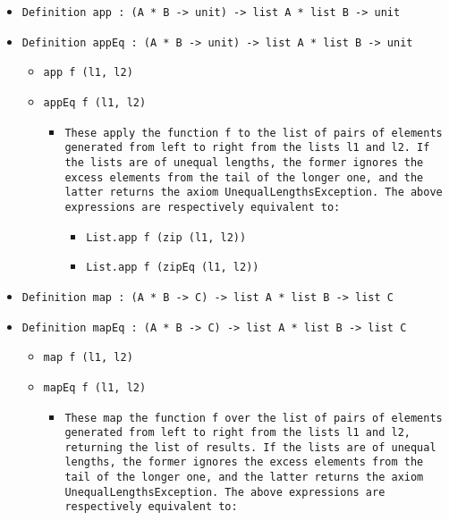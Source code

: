 \documentclass[11pt]{report}
\begin{document}
\begin{itemize}
\begin{itemize}
\end{itemize}

\item  \texttt{Definition app : (A * B -> unit) -> list A * list B -> unit}

\item  \texttt{Definition appEq : (A * B -> unit) -> list A * list B -> unit}

\begin{itemize} 
\item \texttt{app f (l1, l2)} 
\item \texttt{appEq f (l1, l2)} 

\begin{itemize}

\item \begin{flushleft} \texttt{These apply the function f to the list of pairs of elements generated from left to right from the lists l1 and l2. If the lists are of unequal lengths, the former ignores the excess elements from the tail of the longer one, and the latter returns the axiom UnequalLengthsException. The above expressions are respectively equivalent to:} \end{flushleft}

\begin{itemize}
\item  \texttt{List.app f (zip (l1, l2))}
\item  \texttt{List.app f (zipEq (l1, l2))}
\end{itemize}

\end{itemize}
\end{itemize}

\item \texttt{Definition map : (A * B -> C) -> list A * list B -> list C}

\item  \texttt{Definition mapEq : (A * B -> C) -> list A * list B -> list C}

\begin{itemize}
\item \texttt{map f (l1, l2)} 
\item \texttt{mapEq f (l1, l2)} 

\begin{itemize}
\item \begin{flushleft} \texttt{These map the function f over the list of pairs of elements generated from left to right from the lists l1 and l2, returning the list of results. If the lists are of unequal lengths, the former ignores the excess elements from the tail of the longer one, and the latter returns the axiom UnequalLengthsException. The above expressions are respectively equivalent to:} \end{flushleft}


\end{itemize}
\end{itemize}
\end{itemize}
\end{document}

